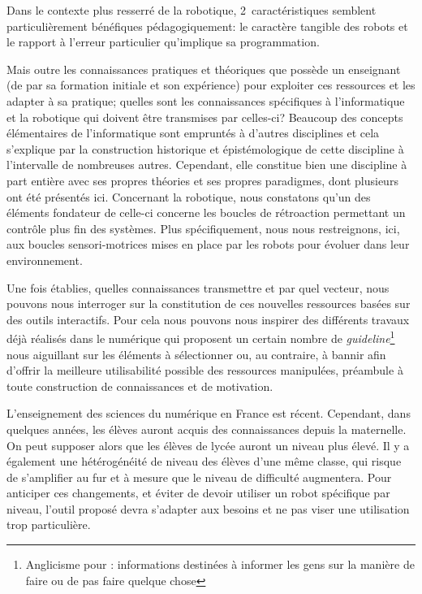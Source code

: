 \begin{concluPart}
Dans le contexte plus resserré de la robotique, 2~caractéristiques semblent particulièrement bénéfiques pédagogiquement: le caractère tangible des robots et le rapport à l'erreur particulier qu'implique sa programmation.\par%
Mais outre les connaissances pratiques et théoriques que possède un enseignant (de par sa formation initiale et son expérience) pour exploiter ces ressources et les adapter à sa pratique; quelles sont les connaissances spécifiques à l'informatique et la robotique qui doivent être transmises par celles-ci? 
Beaucoup des concepts élémentaires de l'informatique sont empruntés à d'autres disciplines et cela s'explique par la construction historique et épistémologique de cette discipline à l'intervalle de nombreuses autres. Cependant, elle constitue bien une discipline à part entière avec ses propres théories et ses propres paradigmes, dont plusieurs ont été présentés ici.
Concernant la robotique, nous constatons qu'un des éléments fondateur de celle-ci concerne les boucles de rétroaction permettant un contrôle plus fin des systèmes. Plus spécifiquement, nous nous restreignons, ici, aux boucles sensori-motrices mises en place par les robots pour évoluer dans leur environnement.\par%
Une fois établies, quelles connaissances transmettre et par quel vecteur, nous pouvons nous interroger sur la constitution de ces nouvelles ressources basées sur des outils interactifs. Pour cela nous pouvons nous inspirer des différents travaux déjà réalisés dans le numérique qui proposent un certain nombre de \textit{guideline}\footnote{Anglicisme pour : informations destinées à informer les gens sur la manière de faire ou de pas faire quelque chose} nous aiguillant sur les éléments à sélectionner ou, au contraire, à bannir afin d'offrir la meilleure utilisabilité possible des ressources manipulées, préambule à toute construction de connaissances et de motivation.\par%
L'enseignement des sciences du numérique en France est récent. Cependant, dans quelques années, les élèves auront acquis des connaissances depuis la maternelle. On peut supposer alors que les élèves de lycée auront un niveau plus élevé. 
Il y a également une hétérogénéité de niveau des élèves d'une même classe, qui risque de s'amplifier au fur et à mesure que le niveau de difficulté augmentera. Pour anticiper ces changements, et éviter de devoir utiliser un robot spécifique par niveau, l'outil proposé devra s'adapter aux besoins et ne pas viser une utilisation trop particulière.\par%

\end{concluPart}
